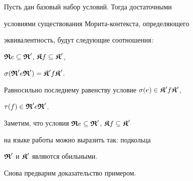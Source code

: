 \begin{thm}


Пусть дан базовый набор условий. Тогда достаточными


условиями существования Морита-контекста, определяющего


эквивалентность, будут следующие соотношения{\em :}


$\R e \subseteq \R'$, $\K f \subseteq \K' $,


$ \s(\R' e \R') = \K' f \K'$.


Равносильно последнему равенству условие $ \s(e) \in \K' f \K'$,


$ \t(f) \in \R' e \R'$.


\end{thm}





Заметим, что условия $\R e \subseteq \R'$, $\K f \subseteq \K' $


на языке работы \cite{Mih} можно выразить так: подкольца


$\R'$ и $\K'$ являются обильными.


Снова предварим доказательство примером.





